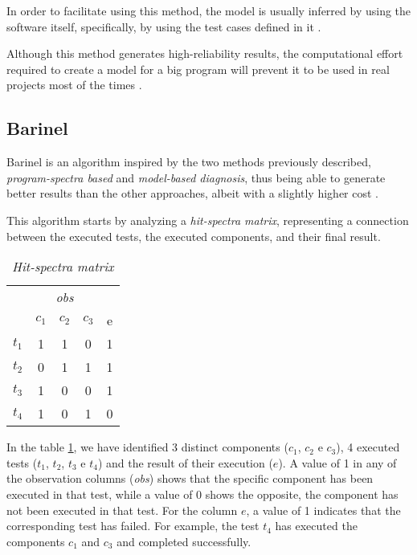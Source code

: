 In order to facilitate using this method, the model is usually inferred by using the software itself, specifically, by using the test cases defined in it \cite{Perez2004}.

Although this method generates high-reliability results, the computational effort required to create a model for a big program will prevent it to be used in real projects most of the times \cite{Mayer2008}.

%
%

\subsection{Barinel}

Barinel is an algorithm inspired by the two methods previously described, \emph{program-spectra based} and \emph{model-based diagnosis}, thus being able to generate better results than the other approaches, albeit with a slightly higher cost \cite{Abreu2009}.

This algorithm starts by analyzing a \emph{hit-spectra matrix}, representing a connection between the executed tests, the executed components, and their final result.

\begin{table}[H]
  \centering
  \begin{tabular}{c|ccc|c}
    & \multicolumn{3}{c|}{\textit{obs}} &  \\
    & $c_1$ & $c_2$ & $c_3$ & e \\
    \hline
    $t_1$ & 1 & 1 & 0 & 1 \\
    $t_2$ & 0 & 1 & 1 & 1 \\
    $t_3$ & 1 & 0 & 0 & 1 \\
    $t_4$ & 1 & 0 & 1 & 0 \\
  \end{tabular}
  \caption{\emph{Hit-spectra matrix}}
  \label{tab:hit-spectra}
\end{table}


In the table \ref{tab:hit-spectra}, we have identified 3 distinct components ($c_1$, $c_2$ e $c_3$), 4 executed tests ($t_1$, $t_2$, $t_3$ e $t_4$) and the result of their execution ($e$). A value of 1 in any of the observation columns (\emph{obs}) shows that the specific component has been executed in that test, while a value of 0 shows the opposite, the component has not been executed in that test. For the column $e$, a value of 1 indicates that the corresponding test has failed.
For example, the test $t_4$ has executed the components $c_1$ and $c_3$ and completed successfully.


